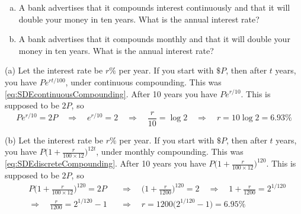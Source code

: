 \begin{eg}\label{eg:SDEmoneyB}
\begin{enumerate}[(a)]
\item A bank advertises that it compounds interest continuously and that
it will double your money in ten years. What is the annual interest rate?

\item A bank advertises that it compounds monthly and that it will
double your money in ten years. What is the annual interest rate?
\end{enumerate}

\soln (a)
Let the interest rate be $r\%$ per year. If you start with $\$P$, then
after $t$ years, you have $Pe^{rt/100}$, under continuous compounding.
This was \eqref{eq:SDEcontinuousCompounding}.
After 10 years you have $Pe^{r/10}$. This is supposed to be $2P$, so
$$
Pe^{r/10}=2P\quad\Longrightarrow\quad
e^{r/10}=2\quad\Longrightarrow\quad
\frac{r}{10}=\log 2\quad\Longrightarrow\quad
r=10\log2 =6.93\%
$$

\noindent (b)
Let the interest rate be $r\%$ per year. If you start with $\$P$, then
after $t$ years, you have $P\big(1+\frac{r}{100\times 12}\big)^{12 t}$,
under monthly compounding. This was \eqref{eq:SDEdiscreteCompounding}.
After 10 years you have $P\big(1+\frac{r}{100\times 12}\big)^{120}$. This is
supposed to be $2P$, so
\begin{align*}
&P\big(1+\frac{r}{100\times 12}\big)^{120}=2P
&&\Longrightarrow\quad
    \big(1+\frac{r}{1200}\big)^{120}=2\quad\Longrightarrow\quad
1+\frac{r}{1200}=2^{1/120}\\
&\Longrightarrow\quad \frac{r}{1200}=2^{1/120}-1
&&\Longrightarrow\quad
r=1200\big(2^{1/120}-1\big) =6.95\%
\end{align*}
\end{eg}

